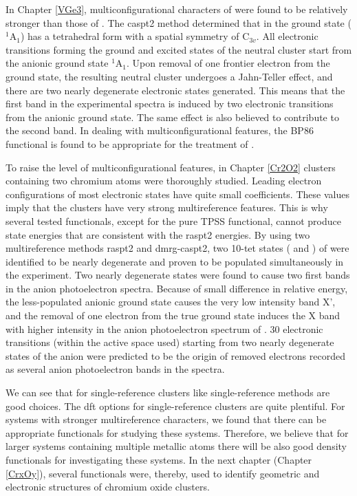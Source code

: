 \begin{refsection}
In Chapter \ref{VGe3}, multiconfigurational characters of  were found to be relatively stronger than those of . The \acrshort{caspt2} method determined that  in the ground state ($^1$A$_1$) has a tetrahedral form with a spatial symmetry of C$_{3v}$. All electronic transitions forming the ground and excited states of the neutral cluster start from the anionic ground state $^1$A$_1$. Upon removal of one frontier electron from the ground state, the resulting neutral cluster undergoes a Jahn-Teller effect, and there are two nearly degenerate electronic states generated. This means that the first band in the experimental spectra is induced by two electronic transitions from the anionic ground state. The same effect is also believed to contribute to the second band. In dealing with multiconfigurational features, the BP86 functional is found to be appropriate for the treatment of . 



To raise the level of multiconfigurational features, in Chapter \ref{Cr2O2} clusters containing two chromium atoms were thoroughly studied. Leading electron configurations of most electronic states have quite small coefficients. These values imply that the  clusters have very strong multireference features. This is why several tested functionals, except for the pure TPSS functional, cannot produce state energies that are consistent with the \acrshort{raspt2} energies. By using two multireference methods \acrshort{raspt2} and \acrshort{dmrg}-\acrshort{caspt2}, two 10-tet states ( and ) of  were identified to be nearly degenerate and proven to be populated simultaneously in the experiment. Two nearly degenerate states were found to cause two first bands in the anion photoelectron spectra. Because of small difference in relative energy, the less-populated anionic ground state  causes the very low intensity band X', and the removal of one electron from the true ground state  induces the X band with higher intensity in the anion photoelectron spectrum of . 30 electronic transitions (within the active space used) starting from two nearly degenerate states of the anion  were predicted to be the origin of removed electrons recorded as several anion photoelectron bands in the spectra.   



We can see that for single-reference clusters like  single-reference methods are good choices. The \acrshort{dft} options for single-reference clusters are quite plentiful. For systems with stronger multireference characters, we found that there can be appropriate functionals for studying these systems. Therefore, we believe that for larger systems containing multiple metallic atoms there will be also good density functionals for investigating these systems. In the next chapter (Chapter \ref{CrxOy}), several functionals were, thereby, used to identify geometric and electronic structures of chromium oxide clusters.






\end{refsection}
